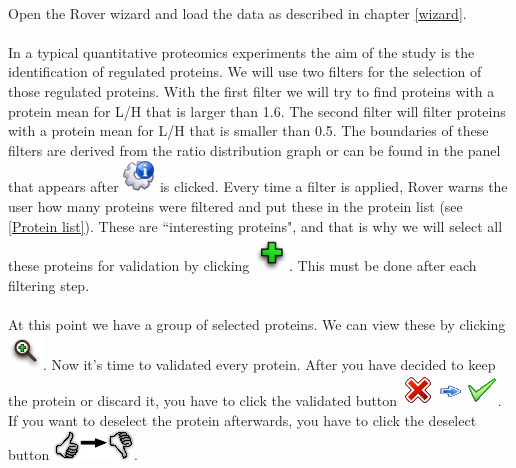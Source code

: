 \documentclass[11pt,a4paper,oneside,notitlepage]{book}
\begin{document}
\paragraph{}Open the Rover wizard and load the data as described in chapter \ref{wizard}.  
\paragraph{}In a typical quantitative proteomics experiments the aim of the study is the identification of regulated proteins. We will use two filters for the selection of those regulated proteins. With the first filter we will try to find proteins with  a protein mean for L/H that is larger than 1.6. The second filter will filter proteins with a protein mean for L/H that is smaller than 0.5. The boundaries of these filters are derived from the ratio distribution graph or can be found in the panel that appears after \includegraphics[scale=0.6, H]{misc_info.png} is clicked. Every time a filter is applied, Rover warns the user how many proteins were filtered and put these in the protein list (see \ref{Protein list}). These are ``interesting proteins",  and that is why we will select all these proteins for validation by clicking \includegraphics[scale=0.6, H]{plus.png}. This must be done after each filtering step.
\paragraph{}At this point we have a group of selected proteins. We can view these by clicking \includegraphics[scale=0.6, H]{viewSelection.png}. Now it's time to validated every protein. After you have decided to keep the protein or discard it, you have to click the validated button \includegraphics[scale=0.6, H]{setValidated.png}. If you want to deselect the protein afterwards, you have to click the deselect button \includegraphics[scale=0.6, H]{deleteSelection.png}.
\end{document}
